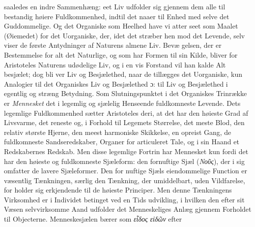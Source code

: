 \documentclass[12pt,a4paper]{book}
\newcommand{\gk}[1]{\textit{#1}}
\begin{document}
saaledes en indre Sammenhæng: eet Liv udfolder sig gjennem
dem alle til bestandig høiere Fuldkommenhed, indtil det naaer
til Enhed med selve det Guddommelige. Og det Organiske
som Heelhed have vi atter seet som Maalet (Øiemedet) for det
Uorganiske, der, idet det stræber hen mod det Levende, selv
viser de første Antydninger af Naturens almene Liv. Bevæ\-%
gelsen, der er Bestemmelse for alt det Naturlige, og som har
Formen til sin Kilde, bliver for Aristoteles Naturens udødelige
Liv, og i en vis Forstand vil han kalde Alt besjælet; dog bli\-%
ver Liv og Besjælethed, naar de tillægges det Uorganiske, kun
Analogier til det Organiskes Liv og Besjælethed ɔ: til Liv og
Besjælethed i egentlig og stræng Betydning.
Som Slutningspunktet i det Organiskes Trinrække er
\emph{Mennesket} det i legemlig og sjælelig Henseende fuldkomneste
Levende. Dets legemlige Fuldkommenhed sætter Aristoteles
deri, at det har den høieste Grad af Livsvarme, det reneste
og, i Forhold til Legemets Størrelse, det meste Blod, den
relativ største Hjerne, den meest harmoniske Skikkelse, en
opreist Gang, de fuldkomneste Sandseredskaber, Organer for
articuleret Tale, og i sin Haand et Redskabernes Redskab.
Men disse legemlige Fortrin har Mennesket kun fordi det har
den høieste og fuldkomneste Sjæleform: den fornuftige Sjæl
(\gk{Νοῦς}), der i sig omfatter de lavere Sjæleformer. Den for\-%
nuftige Sjæls eiendommelige Function er væsentlig Tænkningen,
særlig den Tænkning, der umiddelbart, uden Vildfarelse, for\-%
holder sig erkjendende til de høieste Principer. Men denne
Tænkningens Virksomhed er i Individet betinget ved en Tids\-%
udvikling, i hvilken den efter sit Væsen selvvirksomme Aand
udfolder det Menneskeliges Anlæg gjennem Forholdet til
Objecterne. Menneskesjælen bærer som \gk{εἶδος εἰδῶν} efter
\end{document}
